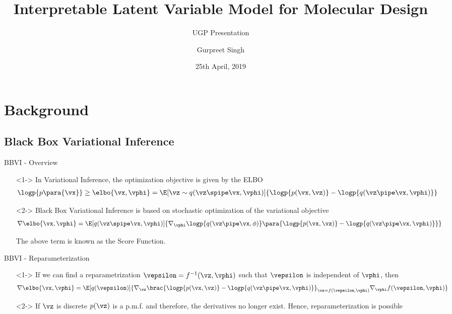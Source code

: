 \documentclass[9pt]{beamer}
\title{Interpretable Latent Variable Model for Molecular Design}
\subtitle{UGP Presentation}
\date{25th April, 2019}
\author{Gurpreet Singh}
\institute{Indian Institute of Technology, Kanpur}
\newcommand{\pp}{p\para}
\begin{document}
\frame{\titlepage}

\section{Background}

\subsection{Black Box Variational Inference}
\begin{frame}{BBVI - Overview}
	\begin{enumerate}
		\item[] <1-> In Variational Inference, the optimization objective is given by the ELBO
			\begin{align*}
				\logp{\pp{\vx}} \ge \elbo{\vx, \vphi} = \E[\vz \sim q(\vz \spipe \vx, \vphi)]{\logp{p(\vx, \vz)} - \logp{q(\vz \pipe \vx, \vphi)}}
			\end{align*}

		\item[] <2-> Black Box Variational Inference is based on stochastic optimization of the variational objective
			\begin{align*}
				\nabla \elbo{\vx, \vphi} &= \E[q(\vz \spipe \vx, \vphi)]{\nabla_\vphi \logp{q(\vz \pipe \vx, \phi)} \para{\logp{p(\vx, \vz)} - \logp{q(\vz \pipe \vx, \vphi)}}}
			\end{align*}

			The above term is known as the Score Function.
	\end{enumerate}

\end{frame}

\begin{frame}{BBVI - Reparameterization}
	\begin{enumerate}
		\item[] <1-> If we can find a reparametrization $\vepsilon = f^{-1}(\vz, \vphi)$ such that $\vepsilon$ is independent of $\vphi$, then
			\begin{align*}
				\nabla \elbo{\vx, \vphi} = \E[q(\vepsilon)]{\nabla_\vz \brac{\logp{p(\vx, \vz)} - \logp{q(\vz \pipe \vx, \vphi)}}_{\vz = f(\vepsilon, \vphi)} \nabla_{\vphi} f(\vepsilon, \vphi)}
			\end{align*}

		\item[] <2-> If $\vz$ is discrete $p(\vz)$ is a p.m.f. and therefore, the derivatives no longer exist. Hence, reparameterization is  possible
	\end{enumerate}
\end{frame}
\end{document}
